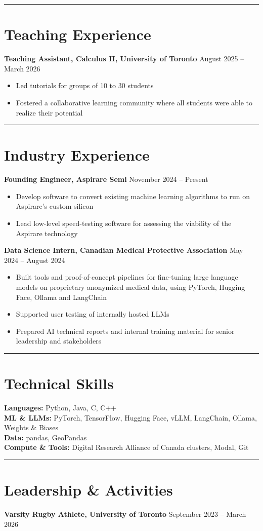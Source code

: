 \documentclass[11pt,letterpaper]{article}
\let\oldsection\section
\renewcommand{\section}[1]{\par\needspace{6\baselineskip}\vspace{4pt}\noindent\rule{\textwidth}{0.4pt}\par\oldsection*{#1}}
\newcommand{\entry}[2]{\textbf{#1} \hfill #2\par}
\begin{document}
\section{Teaching Experience}
\entry{Teaching Assistant, Calculus II, University of Toronto}{August 2025 -- March 2026}
\begin{itemize}
  \item Led tutorials for groups of 10 to 30 students
  \item Fostered a collaborative learning community where all students were able to realize their potential
\end{itemize}

\section{Industry Experience}

\entry{Founding Engineer, Aspirare Semi}{November 2024 -- Present}
\begin{itemize}
  \item Develop software to convert existing machine learning algorithms to run on Aspirare's custom silicon
  \item Lead low-level speed-testing software for assessing the viability of the Aspirare technology
\end{itemize}

\entry{Data Science Intern, Canadian Medical Protective Association}{May 2024 -- August 2024}
\begin{itemize}
  \item Built tools and proof-of-concept pipelines for fine-tuning large language models on proprietary anonymized medical data, using PyTorch, Hugging Face, Ollama and LangChain
  \item Supported user testing of internally hosted LLMs
  \item Prepared AI technical reports and internal training material for senior leadership and stakeholders
\end{itemize}

\section{Technical Skills}
\textbf{Languages:} Python, Java, C, C++ \\
\textbf{ML \& LLMs:} PyTorch, TensorFlow, Hugging Face, vLLM, LangChain, Ollama, Weights \& Biases \\
\textbf{Data:} pandas, GeoPandas \\
\textbf{Compute \& Tools:} Digital Research Alliance of Canada clusters, Modal, Git

\section{Leadership \& Activities}
\entry{Varsity Rugby Athlete, University of Toronto}{September 2023 -- March 2026}
\end{document}
